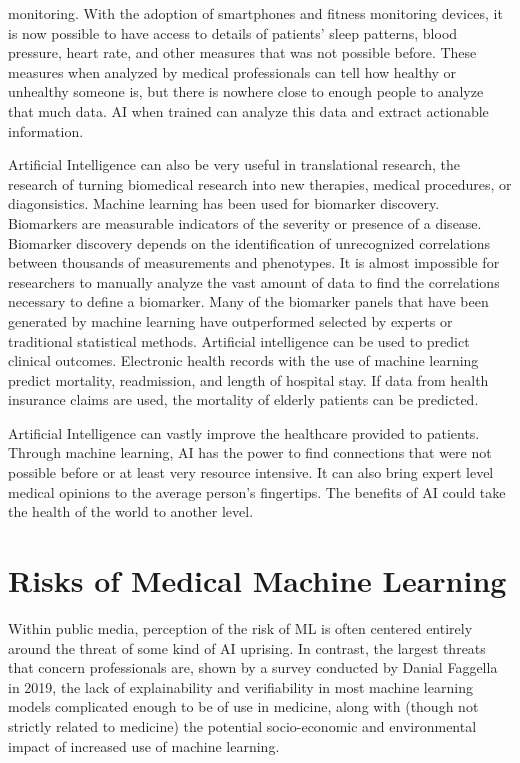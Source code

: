 \documentclass[]{article}
\begin{document}
monitoring. With the adoption of smartphones and fitness monitoring devices, it is now possible to have access to details of patients’ sleep patterns, blood pressure, heart rate, and other measures that was not possible before. These measures when analyzed by medical professionals can tell how healthy or unhealthy someone is, but there is nowhere close to enough people to analyze that much data. AI when trained can analyze this data and extract actionable information.\cite{reddy2019artificial}

		Artificial Intelligence can also be very useful in translational research, the research of turning biomedical research into new therapies, medical procedures, or diagonsistics. Machine learning has been used for biomarker discovery. Biomarkers are measurable indicators of the severity or presence of a disease. Biomarker discovery depends on the identification of unrecognized correlations between thousands of measurements and phenotypes. It is almost impossible for researchers to manually analyze the vast amount of data to find the correlations necessary to define a biomarker. Many of the biomarker panels that have been generated by machine learning have outperformed selected by experts or traditional statistical methods. Artificial intelligence can be used to predict clinical outcomes. Electronic health records with the use of machine learning predict mortality, readmission, and length of hospital stay. If data from health insurance claims are used, the mortality of elderly patients can be predicted.\cite{reddy2019artificial}

		Artificial Intelligence can vastly improve the healthcare provided to patients. Through machine learning, AI has the power to find connections that were not possible before or at least very resource intensive. It can also bring expert level medical opinions to the average person's fingertips. The benefits of AI could take the health of the world to another level.

	\section{Risks of Medical Machine Learning}
		Within public media, perception of the risk of ML is often centered entirely around the threat of some kind of AI uprising.\cite{bbc2016rroai} In contrast, the largest threats that concern professionals are, shown by a survey conducted by Danial Faggella in 2019, the lack of explainability and verifiability in most machine learning models complicated enough to be of use in medicine, along with (though not strictly related to medicine) the potential socio-economic and environmental impact of increased use of machine learning.\cite{emerj2019roawrtiwwa}
			
\end{document}
